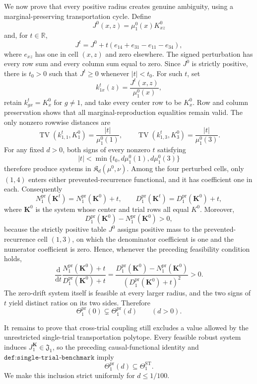 We now prove that every positive radius creates genuine ambiguity, using a marginal-preserving transportation cycle. Define
\[
 J^0(x,z)=\mu_1^0(x)K^0_{xz}
\]
and, for \(t\in\mathbb R\),
\[
 J^t=J^0+t(e_{14}+e_{31}-e_{11}-e_{34}),
\]
where \(e_{xz}\) has one in cell \((x,z)\) and zero elsewhere. The signed perturbation has every row sum and every column sum equal to zero. Since \(J^0\) is strictly positive, there is \(t_0>0\) such that \(J^t\ge0\) whenever \(|t|<t_0\). For such \(t\), set
\[
 k^t_{1x}(z)=\frac{J^t(x,z)}{\mu_1^0(x)},
\]
retain \(k^t_{gx}=K_x^0\) for \(g\ne1\), and take every center row to be \(K_x^0\). Row and column preservation shows that all marginal-reproduction equalities remain valid. The only nonzero rowwise distances are
\[
 \operatorname{TV}(k^t_{1,1},K_1^0)=\frac{|t|}{\mu_1^0(1)},
 \qquad
 \operatorname{TV}(k^t_{1,3},K_3^0)=\frac{|t|}{\mu_1^0(3)}.
\]
For any fixed \(d>0\), both signs of every nonzero \(t\) satisfying
\[
 |t|<\min\{t_0,d\mu_1^0(1),d\mu_1^0(3)\}
\]
therefore produce systems in \(\mathfrak K_d(\mu^0,\nu)\). Among the four perturbed cells, only \((1,4)\) enters either prevented-recurrence functional, and it has coefficient one in each. Consequently
\[
 N_1^{\mathrm{pr}}(\mathbf K^t)=N_1^{\mathrm{pr}}(\mathbf K^0)+t,
 \qquad
 D_1^{\mathrm{pr}}(\mathbf K^t)=D_1^{\mathrm{pr}}(\mathbf K^0)+t,
\]
where \(\mathbf K^0\) is the system whose center and trial rows all equal \(K^0\). Moreover,
\[
 D_1^{\mathrm{pr}}(\mathbf K^0)-N_1^{\mathrm{pr}}(\mathbf K^0)>0,
\]
because the strictly positive table \(J^0\) assigns positive mass to the prevented-recurrence cell \((1,3)\), on which the denominator coefficient is one and the numerator coefficient is zero. Hence, whenever the preceding feasibility condition holds,
\[
 \frac{\mathrm d}{\mathrm dt}
 \frac{N_1^{\mathrm{pr}}(\mathbf K^0)+t}
      {D_1^{\mathrm{pr}}(\mathbf K^0)+t}
 =\frac{D_1^{\mathrm{pr}}(\mathbf K^0)-N_1^{\mathrm{pr}}(\mathbf K^0)}
 {(D_1^{\mathrm{pr}}(\mathbf K^0)+t)^2}>0.
\]
The zero-drift system itself is feasible at every larger radius, and the two signs of \(t\) yield distinct ratios on its two sides. Therefore
\[
 \Theta_1^{\mathrm{pr}}(0)\subsetneq\Theta_1^{\mathrm{pr}}(d)
 \qquad(d>0).
\]

It remains to prove that cross-trial coupling still excludes a value allowed by the unrestricted single-trial transportation polytope. Every feasible robust system induces \(J_1^{\mathbf K}\in\mathfrak J_1\), so the preceding causal-functional identity and \(\texttt{def:single-trial-benchmark}\) imply
\[
 \Theta_1^{\mathrm{pr}}(d)\subseteq\Theta_1^{\mathrm{ST}}.
\]
We make this inclusion strict uniformly for \(d\le1/100\).

